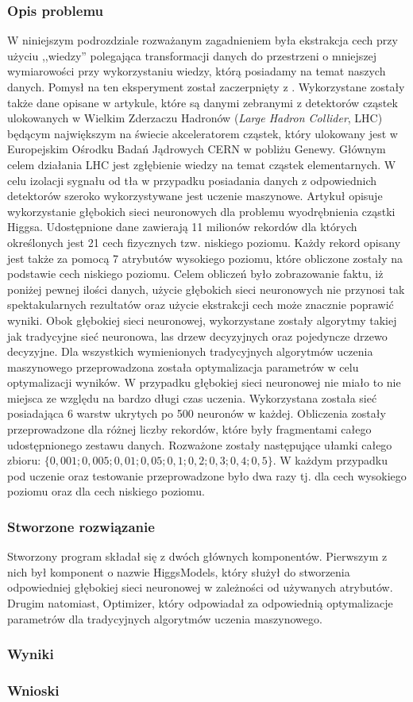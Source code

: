 \subsubsection{Opis problemu}
W niniejszym podrozdziale rozważanym zagadnieniem była ekstrakcja cech przy użyciu ,,wiedzy'' polegająca transformacji danych do przestrzeni o mniejszej wymiarowości przy wykorzystaniu wiedzy, którą posiadamy na temat naszych danych. Pomysł na ten eksperyment został zaczerpnięty z \cite{higgs1}. Wykorzystane zostały także dane opisane w artykule, które są danymi zebranymi z detektorów cząstek ulokowanych w Wielkim Zderzaczu Hadronów (\textit{Large Hadron Collider}, LHC) będącym największym na świecie akceleratorem cząstek, który ulokowany jest w Europejskim Ośrodku Badań Jądrowych CERN w pobliżu Genewy. Głównym celem działania LHC jest zgłębienie wiedzy na temat cząstek elementarnych. W celu izolacji sygnału od tła w przypadku posiadania danych z odpowiednich detektorów szeroko wykorzystywane jest uczenie maszynowe. Artykuł opisuje wykorzystanie głębokich sieci neuronowych dla problemu wyodrębnienia cząstki Higgsa. Udostępnione dane zawierają 11 milionów rekordów dla których określonych jest 21 cech fizycznych tzw. niskiego poziomu. Każdy rekord opisany jest także za pomocą 7 atrybutów wysokiego poziomu, które obliczone zostały na podstawie cech niskiego poziomu. Celem obliczeń było zobrazowanie faktu, iż poniżej pewnej ilości danych, użycie głębokich sieci neuronowych nie przynosi tak spektakularnych rezultatów oraz użycie ekstrakcji cech może znacznie poprawić wyniki. Obok głębokiej sieci neuronowej, wykorzystane zostały algorytmy takiej jak tradycyjne sieć neuronowa, las drzew decyzyjnych oraz pojedyncze drzewo decyzyjne. Dla wszystkich wymienionych tradycyjnych algorytmów uczenia maszynowego przeprowadzona została optymalizacja parametrów w celu optymalizacji wyników. W przypadku głębokiej sieci neuronowej nie miało to nie miejsca ze względu na bardzo długi czas uczenia. Wykorzystana została sieć posiadająca 6 warstw ukrytych po 500 neuronów w każdej. Obliczenia zostały przeprowadzone dla różnej liczby rekordów, które były fragmentami całego udostępnionego zestawu danych. Rozważone zostały następujące ułamki całego zbioru: $\{0,001; 0,005; 0,01; 0,05; 0,1; 0,2; 0,3; 0,4; 0,5\}$. W każdym przypadku pod uczenie oraz testowanie przeprowadzone było dwa razy tj. dla cech wysokiego poziomu oraz dla cech niskiego poziomu.

\subsubsection{Stworzone rozwiązanie}
Stworzony program składał się z dwóch głównych komponentów. Pierwszym z nich był komponent o nazwie HiggsModels, który służył do stworzenia odpowiedniej głębokiej sieci neuronowej w zależności od używanych atrybutów. Drugim natomiast, Optimizer, który odpowiadał za odpowiednią optymalizacje parametrów dla tradycyjnych algorytmów uczenia maszynowego.

\subsubsection{Wyniki}
\subsubsection{Wnioski}

